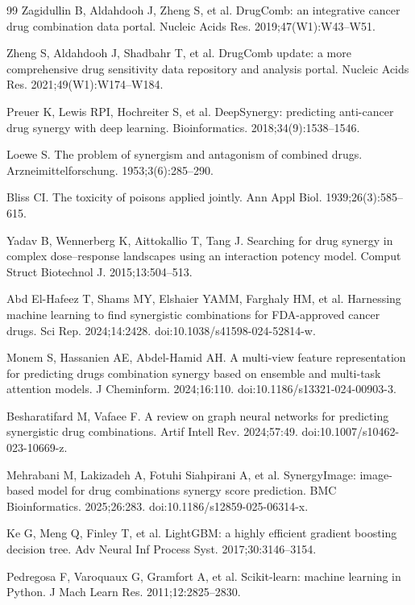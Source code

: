 \documentclass{bmcart}
\begin{document}
\begin{backmatter}
\begin{thebibliography}{99}
Zagidullin B, Aldahdooh J, Zheng S, et al.
DrugComb: an integrative cancer drug combination data portal.
Nucleic Acids Res. 2019;47(W1):W43--W51.

Zheng S, Aldahdooh J, Shadbahr T, et al.
DrugComb update: a more comprehensive drug sensitivity data repository and analysis portal.
Nucleic Acids Res. 2021;49(W1):W174--W184.

Preuer K, Lewis RPI, Hochreiter S, et al.
DeepSynergy: predicting anti-cancer drug synergy with deep learning.
Bioinformatics. 2018;34(9):1538--1546.

Loewe S.
The problem of synergism and antagonism of combined drugs.
Arzneimittelforschung. 1953;3(6):285--290.

Bliss CI.
The toxicity of poisons applied jointly.
Ann Appl Biol. 1939;26(3):585--615.

Yadav B, Wennerberg K, Aittokallio T, Tang J.
Searching for drug synergy in complex dose--response landscapes using an interaction potency model.
Comput Struct Biotechnol J. 2015;13:504--513.

Abd El-Hafeez T, Shams MY, Elshaier YAMM, Farghaly HM, et al.
Harnessing machine learning to find synergistic combinations for FDA-approved cancer drugs.
Sci Rep. 2024;14:2428. doi:10.1038/s41598-024-52814-w.

Monem S, Hassanien AE, Abdel-Hamid AH.
A multi-view feature representation for predicting drugs combination synergy based on ensemble and
multi-task attention models. J Cheminform. 2024;16:110. doi:10.1186/s13321-024-00903-3.

Besharatifard M, Vafaee F.
A review on graph neural networks for predicting synergistic drug combinations.
Artif Intell Rev. 2024;57:49. doi:10.1007/s10462-023-10669-z.

Mehrabani M, Lakizadeh A, Fotuhi Siahpirani A, et al.
SynergyImage: image-based model for drug combinations synergy score prediction.
BMC Bioinformatics. 2025;26:283. doi:10.1186/s12859-025-06314-x.

Ke G, Meng Q, Finley T, et al.
LightGBM: a highly efficient gradient boosting decision tree.
Adv Neural Inf Process Syst. 2017;30:3146--3154.

Pedregosa F, Varoquaux G, Gramfort A, et al.
Scikit-learn: machine learning in Python.
J Mach Learn Res. 2011;12:2825--2830.


\end{thebibliography}
\end{backmatter}
\end{document}
